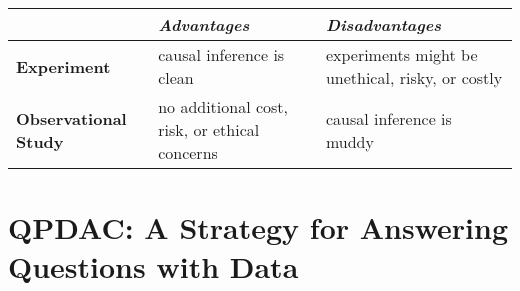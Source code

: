 \begin{table}[!htbp]
    \centering
    \begin{tabularx}{\linewidth}{@{}YYY@{}}
                                     & \emph{Advantages}                             & \emph{Disadvantages}                             \\
        \midrule
        \textbf{Experiment}          & causal inference is clean                     & experiments might be unethical, risky, or costly \\
        \textbf{Observational Study} & no additional cost, risk, or ethical concerns & causal inference is muddy
    \end{tabularx}
\end{table}
\section{QPDAC: A Strategy for Answering Questions with Data}
